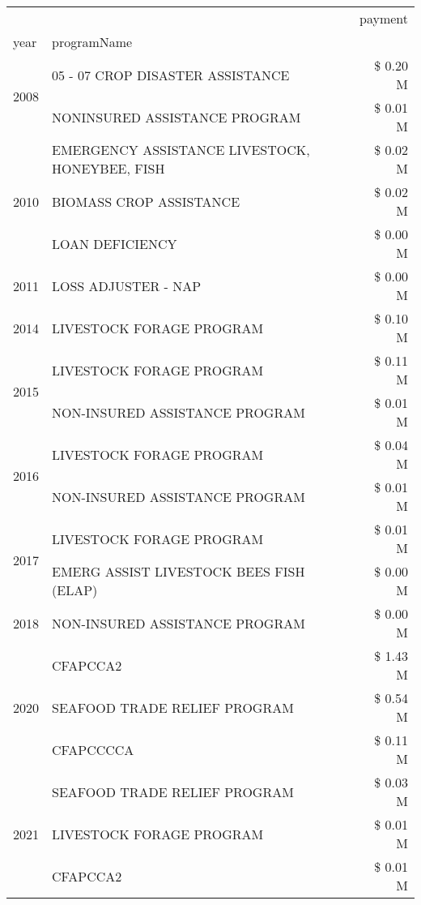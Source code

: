 \begin{tabular}{llr}
\toprule
 &  & payment \\
year & programName &  \\
\midrule
\multirow[t]{2}{*}{2008} & 05 - 07 CROP DISASTER ASSISTANCE & \$ 0.20 M \\
 & NONINSURED ASSISTANCE PROGRAM & \$ 0.01 M \\
\cline{1-3}
\multirow[t]{3}{*}{2010} & EMERGENCY ASSISTANCE LIVESTOCK, HONEYBEE, FISH & \$ 0.02 M \\
 & BIOMASS CROP ASSISTANCE & \$ 0.02 M \\
 & LOAN DEFICIENCY & \$ 0.00 M \\
\cline{1-3}
2011 & LOSS ADJUSTER - NAP & \$ 0.00 M \\
\cline{1-3}
2014 & LIVESTOCK FORAGE PROGRAM & \$ 0.10 M \\
\cline{1-3}
\multirow[t]{2}{*}{2015} & LIVESTOCK FORAGE PROGRAM & \$ 0.11 M \\
 & NON-INSURED ASSISTANCE PROGRAM & \$ 0.01 M \\
\cline{1-3}
\multirow[t]{2}{*}{2016} & LIVESTOCK FORAGE PROGRAM                      & \$ 0.04 M \\
 & NON-INSURED ASSISTANCE PROGRAM                & \$ 0.01 M \\
\cline{1-3}
\multirow[t]{2}{*}{2017} & LIVESTOCK FORAGE PROGRAM & \$ 0.01 M \\
 & EMERG ASSIST LIVESTOCK BEES FISH (ELAP) & \$ 0.00 M \\
\cline{1-3}
2018 & NON-INSURED ASSISTANCE PROGRAM & \$ 0.00 M \\
\cline{1-3}
\multirow[t]{3}{*}{2020} & CFAPCCA2 & \$ 1.43 M \\
 & SEAFOOD TRADE RELIEF PROGRAM & \$ 0.54 M \\
 & CFAPCCCCA & \$ 0.11 M \\
\cline{1-3}
\multirow[t]{3}{*}{2021} & SEAFOOD TRADE RELIEF PROGRAM & \$ 0.03 M \\
 & LIVESTOCK FORAGE PROGRAM & \$ 0.01 M \\
 & CFAPCCA2 & \$ 0.01 M \\
\cline{1-3}
\bottomrule
\end{tabular}
